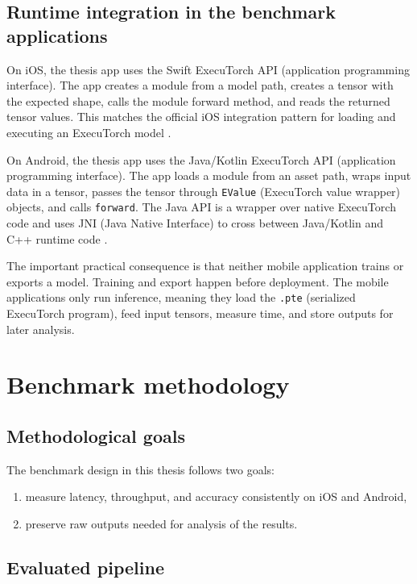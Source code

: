 \section{Runtime integration in the benchmark applications}

On iOS, the thesis app uses the Swift ExecuTorch API (application programming
interface). The app creates a module from a model path, creates a tensor with
the expected shape, calls the module forward method, and reads the returned
tensor values. This matches the official iOS integration pattern for loading
and executing an ExecuTorch model \cite{executorch_ios}.

On Android, the thesis app uses the Java/Kotlin ExecuTorch API (application
programming interface). The app loads a module from an asset path, wraps input
data in a tensor, passes the tensor through \texttt{EValue} (ExecuTorch value wrapper) objects, and calls
\texttt{forward}. The Java API is a wrapper over native ExecuTorch code and
uses JNI (Java Native Interface) to cross between Java/Kotlin and C++ runtime
code \cite{executorch_android}.

The important practical consequence is that neither mobile application trains
or exports a model. Training and export happen before deployment. The mobile
applications only run inference, meaning they load the \texttt{.pte}
(serialized ExecuTorch program), feed input tensors, measure time, and store
outputs for later analysis.

\chapter{Benchmark methodology}

\section{Methodological goals}

The benchmark design in this thesis follows two goals:
\begin{enumerate}
    \item measure latency, throughput, and accuracy consistently on iOS and
          Android,
    \item preserve raw outputs needed for analysis of the results.
\end{enumerate}

\section{Evaluated pipeline}

